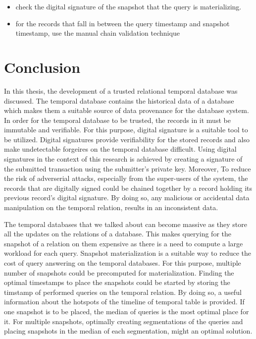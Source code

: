 		\begin{itemize}
			\item check the digital signature of the snapshot that the query is materializing.
			\item for the records that fall in between the query timestamp and snapshot timestamp, use the manual chain validation technique
		\end{itemize}


	\section{Conclusion}
		In this thesis, the development of a trusted relational temporal database was discussed. The temporal database contains the historical data of a database which makes them a suitable source of data provenance for the database system. In order for the temporal database to be trusted, the records in it must be immutable and verifiable. For this purpose, digital signature is a suitable tool to be utilized. Digital signatures provide verifiability for the stored records and also make undetectable forgeires on the temporal database difficult. Using digital signatures in the context of this research is achieved by creating a signature of the submitted transaction using the submitter's private key. Moreover, To reduce the risk of adverserial attacks, especially from the super-users of the system, the records that are digitally signed could be chained together by a record holding its previous record's digital signature. By doing so, any malicious or accidental data manipulation on the temporal relation, results in an inconsistent data.

		The temporal databases that we talked about can become massive as they store all the updates on the relations of a database. This makes querying for the snapshot of a relation on them expensive as there is a need to compute a large workload for each query. Snapshot materialization is a suitable way to reduce the cost of query answering on the temporal databases. For this purpose, multiple number of snapshots could be precomputed for materialization. Finding the optimal timestamps to place the snapshots could be started by storing the timstamp of performed queries on the temporal relation. By doing so, a useful information about the hotspots of the timeline of temporal table is provided. If one snapshot is to be placed, the median of queries is the most optimal place for it. For multiple snapshots, optimally creating segmentations of the queries and placing snapshots in the median of each segmentation, might an optimal solution.
		
